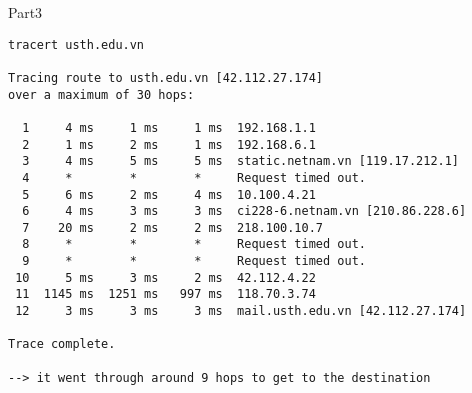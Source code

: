\documentclass{report}
\begin{document}
\begin{section}{Part3}
\begin{verbatim}
tracert usth.edu.vn

Tracing route to usth.edu.vn [42.112.27.174]
over a maximum of 30 hops:

  1     4 ms     1 ms     1 ms  192.168.1.1
  2     1 ms     2 ms     1 ms  192.168.6.1
  3     4 ms     5 ms     5 ms  static.netnam.vn [119.17.212.1]
  4     *        *        *     Request timed out.
  5     6 ms     2 ms     4 ms  10.100.4.21
  6     4 ms     3 ms     3 ms  ci228-6.netnam.vn [210.86.228.6]
  7    20 ms     2 ms     2 ms  218.100.10.7
  8     *        *        *     Request timed out.
  9     *        *        *     Request timed out.
 10     5 ms     3 ms     2 ms  42.112.4.22
 11  1145 ms  1251 ms   997 ms  118.70.3.74
 12     3 ms     3 ms     3 ms  mail.usth.edu.vn [42.112.27.174]

Trace complete.

--> it went through around 9 hops to get to the destination

\end{verbatim}

\end{section}
\end{document}
